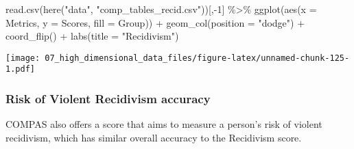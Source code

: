 \documentclass[
]{book}
\newenvironment{Shaded}{\begin{snugshade}}{\end{snugshade}}
\newcommand{\AttributeTok}[1]{\textcolor[rgb]{0.77,0.63,0.00}{#1}}
\newcommand{\DecValTok}[1]{\textcolor[rgb]{0.00,0.00,0.81}{#1}}
\newcommand{\FunctionTok}[1]{\textcolor[rgb]{0.00,0.00,0.00}{#1}}
\newcommand{\NormalTok}[1]{#1}
\newcommand{\SpecialCharTok}[1]{\textcolor[rgb]{0.00,0.00,0.00}{#1}}
\newcommand{\StringTok}[1]{\textcolor[rgb]{0.31,0.60,0.02}{#1}}
\begin{document}
\begin{Shaded}
\begin{Highlighting}[]
\FunctionTok{read.csv}\NormalTok{(}\FunctionTok{here}\NormalTok{(}\StringTok{"data"}\NormalTok{, }\StringTok{"comp\_tables\_recid.csv"}\NormalTok{))[,}\SpecialCharTok{{-}}\DecValTok{1}\NormalTok{] }\SpecialCharTok{\%\textgreater{}\%}
  \FunctionTok{ggplot}\NormalTok{(}\FunctionTok{aes}\NormalTok{(}\AttributeTok{x =}\NormalTok{ Metrics, }\AttributeTok{y =}\NormalTok{ Scores, }\AttributeTok{fill =}\NormalTok{ Group)) }\SpecialCharTok{+}
  \FunctionTok{geom\_col}\NormalTok{(}\AttributeTok{position =} \StringTok{"dodge"}\NormalTok{) }\SpecialCharTok{+}
  \FunctionTok{coord\_flip}\NormalTok{() }\SpecialCharTok{+}
  \FunctionTok{labs}\NormalTok{(}\AttributeTok{title =} \StringTok{"Recidivism"}\NormalTok{)}
\end{Highlighting}
\end{Shaded}

\texttt{[image: 07\_high\_dimensional\_data\_files/figure-latex/unnamed-chunk-125-1.pdf]}

\hypertarget{risk-of-violent-recidivism-accuracy}{%
\subsubsection{Risk of Violent Recidivism accuracy}\label{risk-of-violent-recidivism-accuracy}}

COMPAS also offers a score that aims to measure a person's risk of violent recidivism, which has similar overall accuracy to the Recidivism score.
\end{document}
